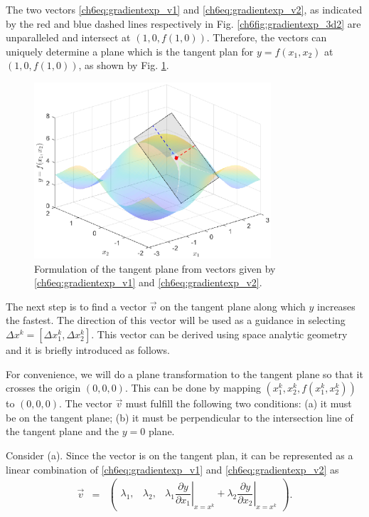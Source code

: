 The two vectors \eqref{ch6eq:gradientexp_v1} and \eqref{ch6eq:gradientexp_v2}, as indicated by the red and blue dashed lines respectively in Fig. \ref{ch6fig:gradientexp_3d2} are unparalleled and intersect at $\left(1,0,f(1,0)\right)$. Therefore, the vectors can uniquely determine a plane which is the tangent plan for $y=f(x_1,x_2)$ at $\left(1,0,f(1,0)\right)$, as shown by Fig. \ref{ch6fig:gradientexp_3d3}.

\begin{figure}
	\centering
	\includegraphics[width=250pt]{chapters/chapter6/figures/gradientexp_3d3.eps}
	\caption{Formulation of the tangent plane from vectors given by \eqref{ch6eq:gradientexp_v1} and \eqref{ch6eq:gradientexp_v2}.} \label{ch6fig:gradientexp_3d3}
\end{figure}

The next step is to find a vector $\vec{v}$ on the tangent plane along which $y$ increases the fastest. The direction of this vector will be used as a guidance in selecting $\Delta x^k = [\Delta x_1^k, \Delta x_2^k]$. This vector can be derived using space analytic geometry and it is briefly introduced as follows.

For convenience, we will do a plane transformation to the tangent plane so that it crosses the origin $(0,0,0)$. This can be done by mapping $\left(x_1^k,x_2^k,f(x_1^k,x_2^k)\right)$ to $(0,0,0)$. The vector $\vec{v}$ must fulfill the following two conditions: (a) it must be on the tangent plane; (b) it must be perpendicular to the intersection line of the tangent plane and the $y=0$ plane.

Consider (a). Since the vector is on the tangent plan, it can be represented as a linear combination of \eqref{ch6eq:gradientexp_v1} and \eqref{ch6eq:gradientexp_v2} as
\begin{eqnarray}
    \vec{v}&=& \left(\begin{array}{ccc}
              \lambda_1, & \lambda_2, & \lambda_1\left.\dfrac{\partial y}{\partial x_1}\right|_{x=x^k} + \lambda_2\left.\dfrac{\partial y}{\partial x_2}\right|_{x=x^k}
            \end{array} \right) . \label{ch6eq:gradient_v}
\end{eqnarray}

